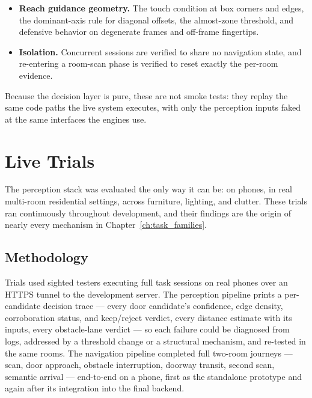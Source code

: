 \begin{itemize}[nosep]
        case noise, multi-word targets (``dining table'', ``living room''), and
        the completion, cancel, and information vocabularies used mid-task; a
        closing pair of tests verifies that \emph{every} supported noun and
        destination is reachable through at least one template.
  \item \textbf{Reach guidance geometry.} The touch condition at box corners and
        edges, the dominant-axis rule for diagonal offsets, the almost-zone
        threshold, and defensive behavior on degenerate frames and off-frame
        fingertips.
  \item \textbf{Isolation.} Concurrent sessions are verified to share no
        navigation state, and re-entering a room-scan phase is verified to reset
        exactly the per-room evidence.
\end{itemize}

Because the decision layer is pure, these are not smoke tests: they replay the
same code paths the live system executes, with only the perception inputs faked at
the same interfaces the engines use.

\section{Live Trials}
\label{sec:live_trials}

The perception stack was evaluated the only way it can be: on phones, in real
multi-room residential settings, across furniture, lighting, and clutter. These
trials ran continuously throughout development, and their findings are the origin
of nearly every mechanism in Chapter~\ref{ch:task_families}.

\subsection{Methodology}

Trials used sighted testers executing full task sessions on real phones over an
HTTPS tunnel to the development server. The perception pipeline prints a
per-candidate decision trace --- every door candidate's confidence, edge density,
corroboration status, and keep/reject verdict, every distance estimate with its
inputs, every obstacle-lane verdict --- so each failure could be diagnosed from
logs, addressed by a threshold change or a structural mechanism, and re-tested in
the same rooms. The navigation pipeline completed full two-room journeys --- scan,
door approach, obstacle interruption, doorway transit, second scan, semantic
arrival --- end-to-end on a phone, first as the standalone prototype and again
after its integration into the final backend.

